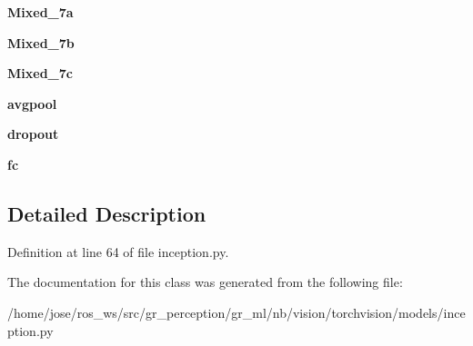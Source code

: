 \begin{DoxyCompactItemize}
{\bfseries Mixed\+\_\+7a}
\item 
\mbox{\label{classtorchvision_1_1models_1_1inception_1_1Inception3_a66ec4b70dcc11454d5cb4f56d89989c2}} 
{\bfseries Mixed\+\_\+7b}
\item 
\mbox{\label{classtorchvision_1_1models_1_1inception_1_1Inception3_a96ef639fcd281799f81579d4a07079e4}} 
{\bfseries Mixed\+\_\+7c}
\item 
\mbox{\label{classtorchvision_1_1models_1_1inception_1_1Inception3_a34950cca05f11dba57a1073b373e7eab}} 
{\bfseries avgpool}
\item 
\mbox{\label{classtorchvision_1_1models_1_1inception_1_1Inception3_a4f2489b1bff1503e5bc5c922f96ab85e}} 
{\bfseries dropout}
\item 
\mbox{\label{classtorchvision_1_1models_1_1inception_1_1Inception3_a3512df7229e3db72cca2500efdb94fc6}} 
{\bfseries fc}
\end{DoxyCompactItemize}


\subsection{Detailed Description}


Definition at line 64 of file inception.\+py.



The documentation for this class was generated from the following file\+:\begin{DoxyCompactItemize}
\item 
/home/jose/ros\+\_\+ws/src/gr\+\_\+perception/gr\+\_\+ml/nb/vision/torchvision/models/inception.\+py\end{DoxyCompactItemize}
